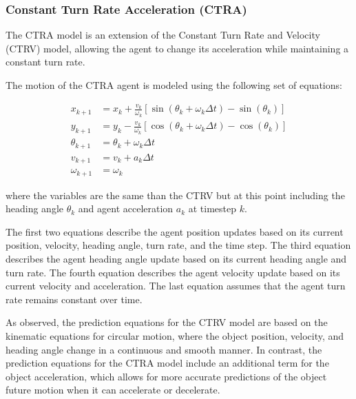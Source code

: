 \subsubsection{Constant Turn Rate Acceleration (CTRA)}
\label{subsubsec:3_CTRA}

The \acf{CTRA} model is an extension of the Constant Turn Rate and Velocity (CTRV) model, allowing the agent to change its acceleration while maintaining a constant turn rate. %


The motion of the \ac{CTRA} agent is modeled using the following set of equations:

\begin{equation}
\begin{split}
		x_{k+1} &= x_k + \frac{v_k}{\omega_k} \left[ \sin(\theta_k + \omega_k \Delta t) - \sin(\theta_k) \right] \\
		y_{k+1} &= y_k - \frac{v_k}{\omega_k} \left[ \cos(\theta_k + \omega_k \Delta t) - \cos(\theta_k) \right] \\
		\theta_{k+1} &= \theta_k + \omega_k \Delta t \\
		v_{k+1} &= v_k + a_k \Delta t \\
		\omega_{k+1} &= \omega_k
\end{split}
\end{equation}

where the variables are the same than the \ac{CTRV} but at this point including the heading angle $\theta_k$ and agent acceleration $a_k$ at timestep $k$.

The first two equations describe the agent position updates based on its current position, velocity, heading angle, turn rate, and the time step. The third equation describes the agent heading angle update based on its current heading angle and turn rate. The fourth equation describes the agent velocity update based on its current velocity and acceleration. The last equation assumes that the agent turn rate remains constant over time.

As observed, the prediction equations for the \ac{CTRV} model are based on the kinematic equations for circular motion, where the object position, velocity, and heading angle change in a continuous and smooth manner. In contrast, the prediction equations for the \ac{CTRA} model include an additional term for the object acceleration, which allows for more accurate predictions of the object future motion when it can accelerate or decelerate.

